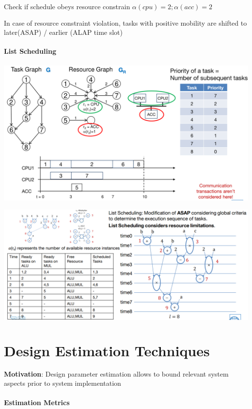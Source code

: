 \documentclass[english]{latex4ei/latex4ei_sheet}
\begin{document}
Check if schedule obeys resource constrain $\alpha(cpu) = 2; \alpha(acc) = 2$ 

In case of resource constraint violation, tasks with positive mobility are shifted to later(ASAP) / earlier (ALAP time slot)

\paragraph{List Scheduling} 


\begin{center}
  \includegraphics[width=0.8\linewidth]{assets/ListSchedulingExample.png}
  \label{fig:listschedulingexample}
\end{center}

\begin{center}
  \centering
  \includegraphics[width=0.8\linewidth]{assets/ListSchedulingTut.png}
  \label{fig:listschedulingtut}
\end{center}

\section{Design Estimation Techniques}

\textbf{Motivation}: Design parameter estimation allows to bound
relevant system aspects prior to system implementation

\paragraph{Estimation Metrics}
\end{document}
